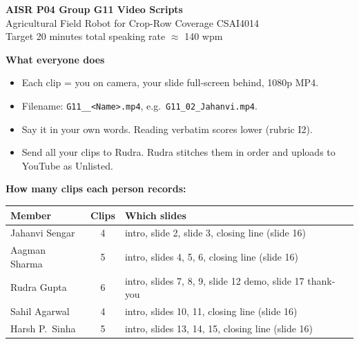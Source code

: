 \documentclass[11pt,a4paper]{article}
\begin{document}
\begin{center}
{\color{brand}\Large\bfseries AISR P04 \textbullet{} Group G11 \textbullet{} Video Scripts}\\[4pt]
{\small Agricultural Field Robot for Crop-Row Coverage \textbullet{} CSAI4014}\\[2pt]
{\small Target 20 minutes total \textbullet{} speaking rate $\approx$ 140 wpm}
\end{center}

\vspace{6pt}

\begin{tcolorbox}[colback=tag,colframe=brand,boxrule=0.5pt,arc=2pt]
\textbf{What everyone does}
\begin{itemize}
  \item Each clip = you on camera, your slide full-screen behind, 1080p MP4.
  \item Filename: \texttt{G11\_<slide no>\_<Name>.mp4}, e.g.\ \texttt{G11\_02\_Jahanvi.mp4}.
  \item Say it in your own words. Reading verbatim scores lower (rubric I2).
  \item Send all your clips to Rudra. Rudra stitches them in order and uploads to YouTube as Unlisted.
\end{itemize}
\end{tcolorbox}

\vspace{4pt}

\noindent\textbf{How many clips each person records:}

\begin{center}
\renewcommand{\arraystretch}{1.25}
\begin{tabular}{|l|c|l|}
\hline
\textbf{Member} & \textbf{Clips} & \textbf{Which slides} \\ \hline
Jahanvi Sengar     & 4 & intro, slide 2, slide 3, closing line (slide 16) \\ \hline
Aagman Sharma      & 5 & intro, slides 4, 5, 6, closing line (slide 16) \\ \hline
Rudra Gupta        & 6 & intro, slides 7, 8, 9, slide 12 demo, slide 17 thank-you \\ \hline
Sahil Agarwal      & 4 & intro, slides 10, 11, closing line (slide 16) \\ \hline
Harsh P.\ Sinha    & 5 & intro, slides 13, 14, 15, closing line (slide 16) \\ \hline
\end{tabular}
\end{center}
\end{document}
